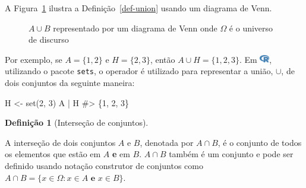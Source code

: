 \documentclass[
  letterpaper,
]{book}
\newenvironment{Shaded}{\begin{snugshade}}{\end{snugshade}}
\newcommand{\CommentTok}[1]{\textcolor[rgb]{0.37,0.37,0.37}{#1}}
\newcommand{\DecValTok}[1]{\textcolor[rgb]{0.68,0.00,0.00}{#1}}
\newcommand{\FunctionTok}[1]{\textcolor[rgb]{0.28,0.35,0.67}{#1}}
\newcommand{\NormalTok}[1]{\textcolor[rgb]{0.00,0.23,0.31}{#1}}
\newcommand{\OtherTok}[1]{\textcolor[rgb]{0.00,0.23,0.31}{#1}}
\newcommand{\SpecialCharTok}[1]{\textcolor[rgb]{0.37,0.37,0.37}{#1}}
\theoremstyle{plain}
\theoremstyle{definition}
\newtheorem{definition}{Definição}[chapter]
\theoremstyle{remark}
\begin{document}
A Figura~\ref{fig-union-venn-diagram} ilustra a
Definição~\ref{def-union} usando um diagrama de Venn.

\begin{figure}


\caption{\label{fig-union-venn-diagram}\(A \cup B\) representado por um
diagrama de Venn onde \(\Omega\) é o universo de discurso}

\end{figure}%

Por exemplo, se \(A = \{ 1, 2 \}\) e \(H = \{ 2, 3 \}\), então
\(A \cup H = \{ 1, 2, 3 \}\). Em
\includegraphics[width=1.13em,height=1em]{naive_set_theory_files/figure-pdf/fa-icon-9b00320707d42527dde67262afb33ded.pdf},
utilizando o pacote \texttt{sets}, o operador \texttt{\textbar{}} é
utilizado para representar a união, \(\cup\), de dois conjuntos da
seguinte maneira:

\begin{Shaded}
\begin{Highlighting}[]
\NormalTok{H }\OtherTok{\textless{}{-}} \FunctionTok{set}\NormalTok{(}\DecValTok{2}\NormalTok{, }\DecValTok{3}\NormalTok{)}
\NormalTok{A }\SpecialCharTok{|}\NormalTok{ H}
\CommentTok{\#\textgreater{} \{1, 2, 3\}}
\end{Highlighting}
\end{Shaded}

\begin{definition}[Interseção de
conjuntos]\protect\hypertarget{def-intersection}{}\label{def-intersection}

A interseção de dois conjuntos \(A\) e \(B\), denotada por \(A \cap B\),
é o conjunto de todos os elementos que estão em \(A\) \textbf{e} em
\(B\). \(A \cap B\) também é um conjunto e pode ser definido usando
notação construtor de conjuntos como
\(A \cap B = \{ x \in \Omega : x \in A \textbf{ e } x \in B \}\).

\end{definition}
\end{document}
